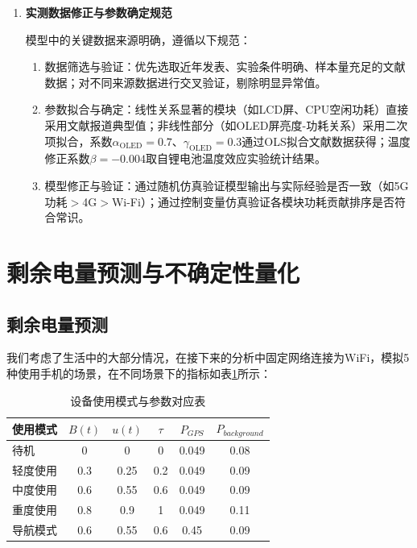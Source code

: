 \documentclass{mcmthesis}  %
\begin{document}
\begin{enumerate}[label=\arabic*.]
		\item \textbf{实测数据修正与参数确定规范}
		
		模型中的关键数据来源明确，遵循以下规范：
		\begin{enumerate}[label=(\arabic*)]
			\item 数据筛选与验证：优先选取近年发表、实验条件明确、样本量充足的文献数据；对不同来源数据进行交叉验证，剔除明显异常值。
			\item 参数拟合与确定：线性关系显著的模块（如LCD屏、CPU空闲功耗）直接采用文献报道典型值；非线性部分（如OLED屏亮度-功耗关系）采用二次项拟合，系数$\alpha_{\text{OLED}}=0.7$、$\gamma_{\text{OLED}}=0.3$通过OLS拟合文献数据获得；温度修正系数$\beta=-0.004$取自锂电池温度效应实验统计结果。
			\item 模型修正与验证：通过随机仿真验证模型输出与实际经验是否一致（如5G功耗$>$4G$>$Wi-Fi）；通过控制变量仿真验证各模块功耗贡献排序是否符合常识。
		\end{enumerate}
	\end{enumerate}
	
	
	
	\section{剩余电量预测与不确定性量化}  %
	
	\subsection{剩余电量预测}
	
	我们考虑了生活中的大部分情况，在接下来的分析中固定网络连接为WiFi，模拟5种使用手机的场景，在不同场景下的指标如表\ref{tab:指标}所示：
	
	\newpage
	
	\begin{table}[h!]
		\centering
		\renewcommand{\arraystretch}{1.5}
		\caption{设备使用模式与参数对应表}
		\label{tab:指标}
		\begin{tabular}{lccccc}  %
			\toprule
			使用模式 & $B(t)$ & $u(t)$ & $\tau$ & $P_{GPS}$ & $P_{background}$ \\
			\midrule
			\rowcolor{pink}
			待机     & 0   & 0    & 0 & 0.049 & 0.08 \\
			轻度使用 & 0.3 & 0.25 & 0.2 & 0.049 & 0.09 \\
			\rowcolor{pink}
			中度使用 & 0.6 & 0.55 & 0.6 & 0.049 & 0.09 \\
			重度使用 & 0.8 & 0.9  & 1 & 0.049 & 0.11 \\
			\rowcolor{pink}
			导航模式 & 0.6 & 0.55 & 0.6 & 0.45  & 0.09 \\  
			\bottomrule
		\end{tabular}
	\end{table}
	
\end{document}
